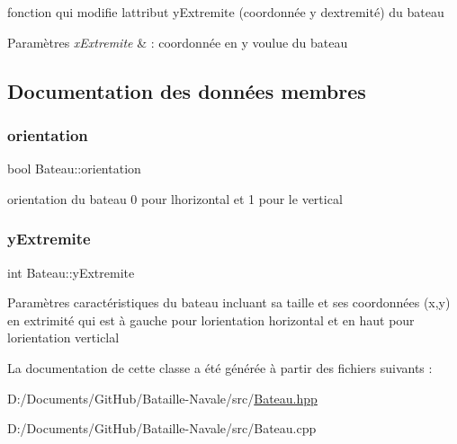fonction qui modifie l\textquotesingle{}attribut y\+Extremite (coordonnée y d\textquotesingle{}extremité) du bateau 


\begin{DoxyParams}{Paramètres}
{\em x\+Extremite} & \+: coordonnée en y voulue du bateau \\
\hline
\end{DoxyParams}


\subsection{Documentation des données membres}
\mbox{\label{class_bateau_a2d3074370ff0c372286522f298830f63}} 
\subsubsection{\texorpdfstring{orientation}{orientation}}
{\footnotesize\ttfamily bool Bateau\+::orientation\hspace{0.3cm}{\ttfamily [private]}}

orientation du bateau 0 pour l\textquotesingle{}horizontal et 1 pour le vertical \mbox{\label{class_bateau_a32294182fa76970d9be2c4de5d8329e6}} 
\subsubsection{\texorpdfstring{y\+Extremite}{yExtremite}}
{\footnotesize\ttfamily int Bateau\+::y\+Extremite\hspace{0.3cm}{\ttfamily [private]}}

Paramètres caractéristiques du bateau incluant sa taille et ses coordonnées (x,y) en extrimité qui est à gauche pour l\textquotesingle{}orientation horizontal et en haut pour l\textquotesingle{}orientation verticlal 

La documentation de cette classe a été générée à partir des fichiers suivants \+:\begin{DoxyCompactItemize}
\item 
D\+:/\+Documents/\+Git\+Hub/\+Bataille-\/\+Navale/src/\mbox{\hyperlink{_bateau_8hpp}{Bateau.\+hpp}}\item 
D\+:/\+Documents/\+Git\+Hub/\+Bataille-\/\+Navale/src/Bateau.\+cpp\end{DoxyCompactItemize}
